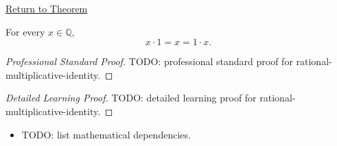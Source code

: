 \newpage
{}
\label{prf:rational-multiplicative-identity}

\begin{remark*}[Return]
\hyperref[thm:rational-multiplicative-identity]{Return to Theorem}
\end{remark*}

\begin{theorem*}
For every $x\in\mathbb{Q}$,
\[
x\cdot 1=x=1\cdot x.
\]
\end{theorem*}

\begin{proof}[Professional Standard Proof]
\LRAProofBodyStart
TODO: professional standard proof for rational-multiplicative-identity.
\end{proof}

\begin{proof}[Detailed Learning Proof]
\LRAProofBodyStart
TODO: detailed learning proof for rational-multiplicative-identity.
\end{proof}

\begin{remark*}
\end{remark*}

\begin{dependencies}
\begin{itemize}
  \item TODO: list mathematical dependencies.
\end{itemize}
\end{dependencies}

\clearpage
